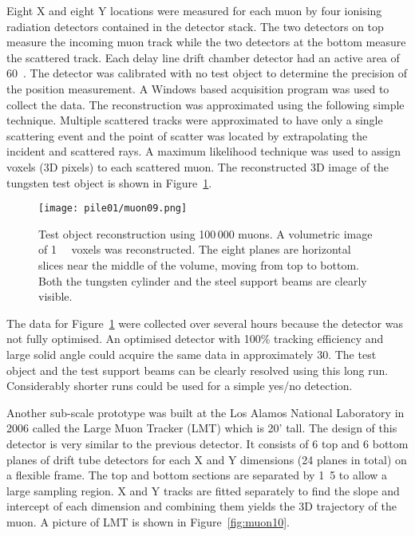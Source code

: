 \documentclass[twoside,titlepage,11pt,twocolumn,a4paper]{article}
\begin{document}
Eight X and eight Y locations were measured for each muon by four
ionising radiation detectors contained in the detector stack. The two
detectors on top measure the incoming muon track while the two
detectors at the bottom measure the scattered track. Each delay line
drift chamber detector had an active area of
\unit{60}{\square{\centi\metre}}. The detector was calibrated
with no test object to determine the precision of the position
measurement. A Windows based acquisition program was used to collect
the data. The reconstruction was approximated using the following
simple technique. Multiple scattered tracks were approximated to have
only a single scattering event and the point of scatter was located by
extrapolating the incident and scattered rays. A maximum likelihood
technique was used to assign voxels (3D pixels) to each scattered
muon. The reconstructed 3D image of the tungsten test object is shown
in Figure~\ref{fig:muon09}. \citep{Priedhorsky2003}

\begin{figure}
  \texttt{[image: pile01/muon09.png]}
  \caption{Test object reconstruction using 100\,000 muons. A
    volumetric image of \unit{1}{\cubic{\centi\metre}}
    voxels was reconstructed. The eight planes are horizontal slices
    near the middle of the volume, moving from top to bottom. Both the
    tungsten cylinder and the steel support beams are clearly
    visible. \citep{Priedhorsky2003}}
  \label{fig:muon09}
\end{figure}

The data for Figure~\ref{fig:muon09} were collected over several hours
because the detector was not fully optimised. An optimised detector
with 100\% tracking efficiency and large solid angle could acquire the
same data in approximately \unit{30}{\minute}. The test object and the
test support beams can be clearly resolved using this long
run. Considerably shorter runs could be used for a simple yes/no
detection. \citep{Priedhorsky2003}

Another sub-scale prototype was built at the Los Alamos National
Laboratory in 2006 called the Large Muon Tracker (LMT) which is 20'
tall. The design of this detector is very similar to the previous
detector. It consists of 6 top and 6 bottom planes of drift tube
detectors for each X and Y dimensions (24 planes in total) on a
flexible frame. The top and bottom sections are separated by
\unit{1.5}{\metre} to allow a large sampling region. X and Y tracks
are fitted separately to find the slope and intercept of each
dimension and combining them yields the 3D trajectory of the muon. A
picture of LMT is shown in Figure~\ref{fig:muon10}. \citep{green2006}
\end{document}
